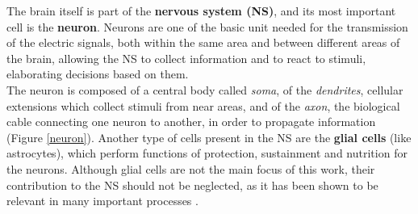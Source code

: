 \documentclass[12pt, a4paper]{report}
\begin{document}
	
	The brain itself is part of the \textbf{nervous system (NS)}, and its most important cell is the \textbf{neuron}.	Neurons are one of the basic unit needed for the transmission of
	the electric signals, both within the same area and between different areas of
	the brain, allowing the NS to collect information and to react to stimuli,
	elaborating decisions based on them. \\
	The neuron is composed of a central body called \textit{soma}, of the \textit{dendrites}, cellular extensions which collect stimuli from near areas, and of the \textit{axon}, the biological cable connecting one neuron to another, in order to propagate information (Figure \ref{neuron}). 
	Another type of cells present in the NS are the \textbf{glial cells} (like astrocytes), which perform functions of protection, sustainment and nutrition for the neurons. Although glial cells are not the main focus of this work, their contribution to the NS should not be neglected, as it has been shown to be relevant in many important processes \cite{1}. %
	
		
	
\end{document}
